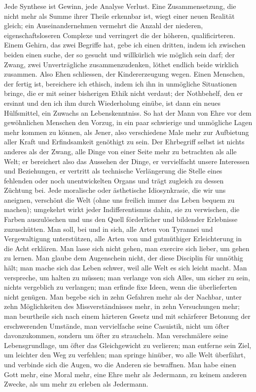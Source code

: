 Jede Synthese ist Gewinn, jede Analyse Verlust. Eine Zusammensetzung, die nicht mehr als Summe ihrer Theile erkennbar ist, wiegt einer neuen Realität gleich; ein Auseinandernehmen vermehrt die Anzahl der niederen, eigenschaftsloseren Complexe und verringert die der höheren, qualificirteren. Einem Gehirn, das zwei Begriffe hat, gebe ich einen dritten, indem ich zwischen beiden einen  suche, der so gesucht und willkürlich wie möglich sein darf; der Zwang, zwei Unverträgliche zusammenzudenken, löthet endlich beide wirklich zusammen. Also Ehen schliessen, der Kindererzeugung wegen. Einen Menschen, der fertig ist, bereichere ich ethisch, indem ich ihn in unmögliche Situationen bringe, die er mit seiner bisherigen Ethik nicht verdaut; der Nothbehelf, den er ersinnt und den ich ihm durch Wiederholung einübe, ist dann ein neues Hülfsmittel, ein Zuwachs an Lebenskenntniss. So hat der Mann von Ehre vor dem gewöhnlichen Menschen den Vorzug, in ein paar schwierige und unmögliche Lagen mehr kommen zu können, als Jener, also verschiedene Male mehr zur Aufbietung aller Kraft und Erfindsamkeit genöthigt zu sein. Der Ehrbegriff selbst ist nichts anderes als der Zwang, alle Dinge von einer Seite mehr zu betrachten als alle Welt; er bereichert also das Aussehen der Dinge, er vervielfacht unsere Interessen und Beziehungen, er vertritt als technische Verlängerung die Stelle eines fehlenden oder noch unentwickelten Organs und trägt zugleich zu dessen Züchtung bei. Jede moralische oder ästhetische Idiosynkrasie, die wir uns aneignen, verschönt die Welt (ohne uns freilich immer das Leben bequem zu machen); umgekehrt wirkt jeder Indifferentismus dahin, sie zu verwischen, die Farben auszulöschen und uns den Quell förderlicher und bildender Erlebnisse zuzuschütten. Man soll, bei und in sich, alle Arten von Tyrannei und Vergewaltigung unterstützen, alle Arten von  und gutmüthiger Erleichterung in die Acht erklären. Man lasse sich nicht gehen, man exercire sich lieber, um gehen zu lernen. Man glaube dem Augenschein nicht, der diese Disciplin für unnöthig hält; man mache sich das Leben schwer, weil alle Welt es sich leicht macht. Man verspreche, um halten zu müssen; man verlange von sich Alles, um sicher zu sein, nichts vergeblich zu verlangen; man erfinde fixe Ideen, wenn die überlieferten nicht genügen. Man begebe sich in zehn Gefahren mehr als der Nachbar, unter zehn Möglichkeiten des Missverständnisses mehr, in zehn Versuchungen mehr; man beurtheile sich nach einem härteren Gesetz und mit schärferer Betonung der erschwerenden Umstände, man vervielfache seine Casuistik, nicht um öfter davonzukommen, sondern um öfter zu straucheln. Man verschmälere seine Lebensgrundlage, um öfter das Gleichgewicht zu verlieren; man entferne sein Ziel, um leichter den Weg zu verfehlen; man springe hinüber, wo alle Welt überfährt, und verbinde sich die Augen, wo die Anderen sie bewaffnen. Man habe einen Gott mehr, eine Moral mehr, eine Ehre mehr als Jedermann, zu keinem anderen Zwecke, als um mehr zu erleben als Jedermann.
\par

